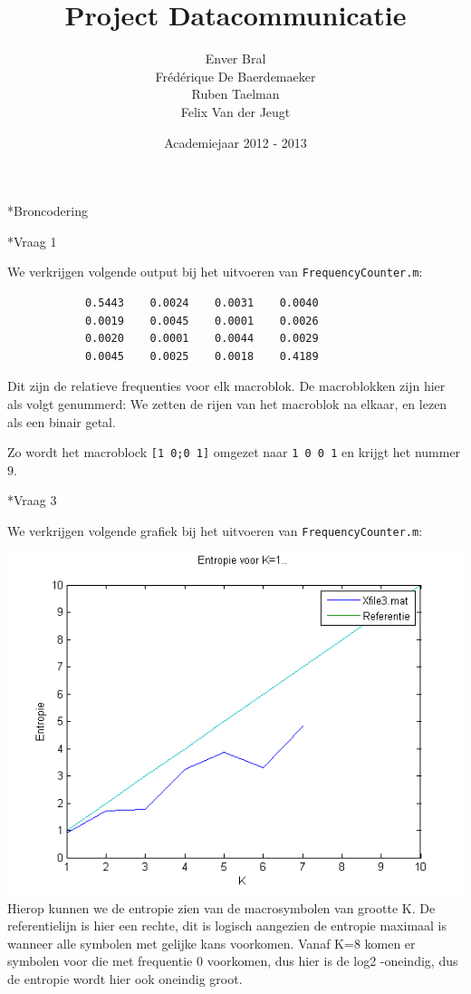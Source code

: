 \documentclass[]{article}
\begin{document}
\title{Project Datacommunicatie}
\author{Enver Bral \\ Fr\'ed\'erique De Baerdemaeker \\ Ruben Taelman \\ Felix Van der Jeugt}
\date{Academiejaar 2012 - 2013}
\maketitle

\begin{section}*{Broncodering}

    \begin{subsection}*{Vraag 1}

        We verkrijgen volgende output bij het uitvoeren van
        \texttt{FrequencyCounter.m}:

        \begin{lstlisting}
            0.5443    0.0024    0.0031    0.0040
            0.0019    0.0045    0.0001    0.0026
            0.0020    0.0001    0.0044    0.0029
            0.0045    0.0025    0.0018    0.4189
        \end{lstlisting}

        Dit zijn de relatieve frequenties voor elk macroblok. De
        macroblokken zijn hier als volgt genummerd: We zetten de rijen
        van het macroblok na elkaar, en lezen als een binair getal.

        Zo wordt het macroblock \texttt{[1 0;0 1]} omgezet naar
        \texttt{1 0 0 1} en krijgt het nummer $9$.

    \end{subsection}
    
        \begin{subsection}*{Vraag 3}

        We verkrijgen volgende grafiek bij het uitvoeren van
        \texttt{FrequencyCounter.m}:

        \includegraphics{vraag1_3.png}
		Hierop kunnen we de entropie zien van de macrosymbolen van grootte K. De referentielijn is hier een rechte, dit is logisch aangezien de entropie maximaal is wanneer alle symbolen met gelijke kans voorkomen.
		Vanaf K=8 komen er symbolen voor die met frequentie 0 voorkomen, dus hier is de log2 -oneindig, dus de entropie wordt hier ook oneindig groot.


\end{subsection}
\end{section}
\end{document}
